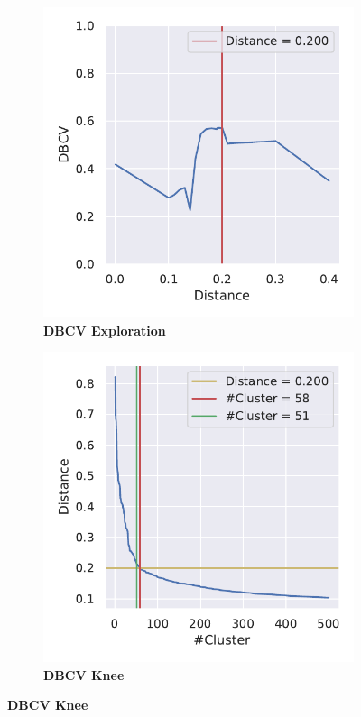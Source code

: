 \begin{figure}
    \centering
    \begin{subfigure}[b]{0.475\textwidth}
        \caption[\Acrshort{DBCV} Exploration]{\textbf{\Acrshort{DBCV} Exploration}}
        \label{subfig:PCA_Cluster_DBCV_Explo_4}            \includegraphics[width=\textwidth]{PCA/Cluster_DBCV_Segment_4.pdf}
    \end{subfigure}
    \hfill
    \begin{subfigure}[b]{0.475\textwidth}
        \caption[\Acrshort{DBCV} Knee]{\textbf{\Acrshort{DBCV} Knee}}
        \label{subfig:PCA_Cluster_DBCV_Elbow_4}            \includegraphics[width=\textwidth]{PCA/Cluster_Elbow_DBCV_Segment_4.pdf}

\end{subfigure}
\end{figure}
